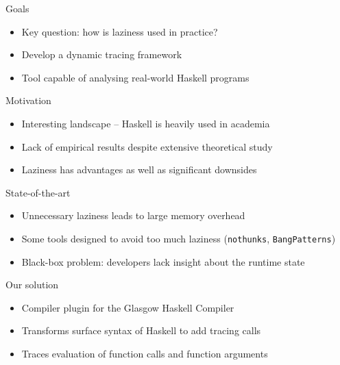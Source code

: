 \documentclass[aspectratio=169]{beamer}
\begin{document}
\begin{frame}{Goals}
	\begin{itemize}
		\item Key question: how is laziness used in practice? \pause
		\item Develop a \alert{dynamic tracing} framework \pause
		\item Tool capable of analysing real-world Haskell programs
	\end{itemize}
\end{frame}

\begin{frame}{Motivation}
	\begin{itemize}
		\item Interesting landscape -- Haskell is heavily used in academia
			\pause
		\item Lack of empirical results despite extensive theoretical study
			\pause
		\item Laziness has advantages as well as significant downsides
	\end{itemize}
\end{frame}

\begin{frame}{State-of-the-art}
	\begin{itemize}
		\item Unnecessary laziness leads to \alert{large memory overhead}
			\pause
		\item Some tools designed to avoid too much laziness
			(\texttt{nothunks}, \texttt{BangPatterns}) \pause
		\item Black-box problem: developers lack insight about the runtime
			state
	\end{itemize}
\end{frame}

\begin{frame}{Our solution}
	\begin{itemize}
		\item Compiler plugin for the \alert{Glasgow Haskell Compiler} \pause
		\item Transforms surface syntax of Haskell to add tracing calls \pause
		\item Traces evaluation of function calls and function arguments
	\end{itemize}
\end{frame}
\end{document}

